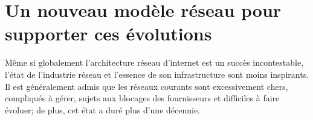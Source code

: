 \section{Un nouveau modèle réseau pour supporter ces évolutions}


Même si globalement l'architecture réseau d'internet est un succès incontestable, l'état de l'industrie réseau et l'essence de son infrastructure sont moins inspirants. Il est généralement admis que les réseaux courants sont excessivement chers, compliqués à gérer, sujets aux blocages des fournisseurs et difficiles à faire évoluer; de plus, cet état a duré plus d'une décennie. \cite{fabricIntro}



